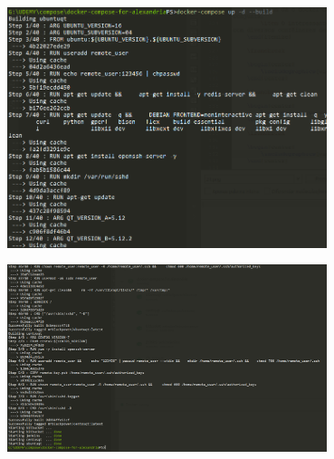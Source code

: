 \documentclass[10pt]{beamer}
\theoremstyle{remark}
\theoremstyle{definition}
\begin{document}
\begin{frame}[allowframebreaks]
	\framebreak
	
	\begin{center}
		\includegraphics[width=0.7\textwidth]{images/26.png}
	\end{center}
	
	\framebreak
	
	\begin{center}
		\includegraphics[width=0.7\textwidth]{images/25.png}
	\end{center}

\end{frame}
\end{document}
